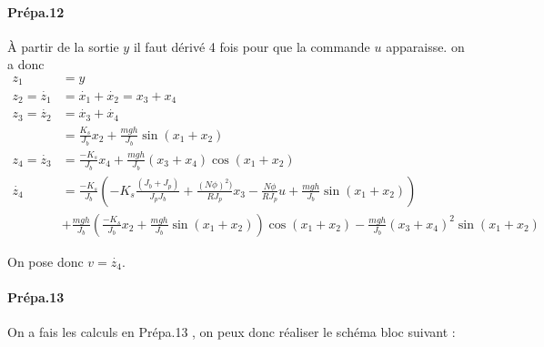 \documentclass[10pt,a4paper,notitlepage]{article}
\begin{document}
\paragraph{Prépa.12}
À partir de la sortie $y$ il faut dérivé 4 fois pour que la commande $u$ apparaisse. on a donc
\begin{align*}
  z_1 & = y \\
  z_2 = \dot{z_1} &= \dot{x_1}+\dot{x_2} = x_3+ x_4 \\
  z_3 = \dot{z_2} &= \dot{x_3}+\dot{x_4} \\
      &= \frac{K_s}{J_b}x_2+\frac{mgh}{J_b}\sin(x_1+x_2)\\
  z_4 =  \dot{z_3} & = \frac{-K_s}{J_b}x_4+\frac{mgh}{J_b}(x_3+x_4)\cos(x_1+x_2)\\
  \dot{z_4} &= \frac{-K_s}{J_b}\left(
              -K_s\frac{(J_b+J_p)}{J_pJ_b}+ \frac{(N\phi)^2)}{RJ_p}x_3 - \frac{N\phi}{RJ_p}u +\frac{mgh}{J_b}\sin(x_1+x_2)
              \right)\\
              &+
              \frac{mgh}{J_b}\left(\frac{-K_s}{J_b}x_2+\frac{mgh}{J_b}\sin(x_1+x_2)
              \right)\cos(x_1+x_2) -
              \frac{mgh}{J_b}(x_3+x_4)^2\sin(x_1+x_2)
\end{align*}

On pose donc $v = \dot{z_4}$. 

\paragraph{Prépa.13}
On a fais les calculs en Prépa.13 , on peux donc réaliser le schéma bloc suivant :
\end{document}
